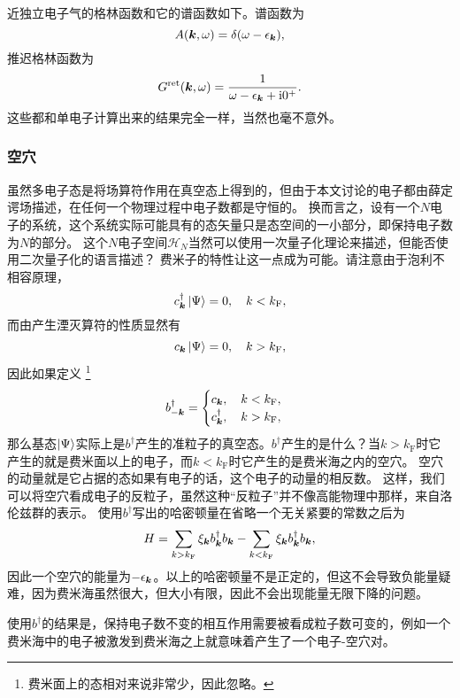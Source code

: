 \documentclass[hyperref, UTF8, a4paper]{ctexart}
\newcommand*{\ii}{\mathrm{i}}
\begin{document}
近独立电子气的格林函数和它的谱函数如下。谱函数为
\begin{equation}
    A(\vb*{k}, \omega) = \delta(\omega - \epsilon_{\vb*{k}}),
\end{equation}
推迟格林函数为
\begin{equation}
    G^\text{ret}(\vb*{k}, \omega) = \frac{1}{\omega - \epsilon_{\vb*{k}} + \ii 0^+}.
\end{equation}
这些都和单电子计算出来的结果完全一样，当然也毫不意外。

\subsubsection{空穴}

虽然多电子态是将场算符作用在真空态上得到的，但由于本文讨论的电子都由薛定谔场描述，在任何一个物理过程中电子数都是守恒的。
换而言之，设有一个$N$电子的系统，这个系统实际可能具有的态矢量只是态空间的一小部分，即保持电子数为$N$的部分。
这个$N$电子空间$\mathcal{H}_N$当然可以使用一次量子化理论来描述，但能否使用二次量子化的语言描述？
费米子的特性让这一点成为可能。请注意由于泡利不相容原理，
\[
    {c}^\dagger_{\vb*{k}} \ket{\Psi} = 0, \quad k < k_\text{F},
\]
而由产生湮灭算符的性质显然有
\[
    {c}_{\vb*{k}} \ket{\Psi} = 0, \quad k > k_\text{F},
\]
因此如果定义%
\footnote{费米面上的态相对来说非常少，因此忽略。}%
\begin{equation}
    {b}^\dagger_{-\vb*{k}} = \begin{cases}
        {c}_{\vb*{k}}, \quad k < k_\text{F}, \\
        {c}_{\vb*{k}}^\dagger, \quad k > k_\text{F},
    \end{cases}
\end{equation}
那么基态$\ket{\Psi}$实际上是${b}^\dagger$产生的准粒子的真空态。${b}^\dagger$产生的是什么？当$k>k_\text{F}$时它产生的就是费米面以上的电子，而$k<k_\text{F}$时它产生的是费米海之内的空穴。
空穴的动量就是它占据的态如果有电子的话，这个电子的动量的相反数。
这样，我们可以将空穴看成电子的反粒子，虽然这种“反粒子”并不像高能物理中那样，来自洛伦兹群的表示。
使用${b}^\dagger$写出的哈密顿量在省略一个无关紧要的常数之后为
\[
    {H} = \sum_{k > k_\text{F}} \xi_{\vb*{k}} {b}^\dagger_{\vb*{k}} {b}_{\vb*{k}} - \sum_{k < k_\text{F}} \xi_{\vb*{k}} {b}^\dagger_{\vb*{k}} {b}_{\vb*{k}},
\]
因此一个空穴的能量为$-\epsilon_{\vb*{k}}$。以上的哈密顿量不是正定的，但这不会导致负能量疑难，因为费米海虽然很大，但大小有限，因此不会出现能量无限下降的问题。

使用${b}^\dagger$的结果是，保持电子数不变的相互作用需要被看成粒子数可变的，例如一个费米海中的电子被激发到费米海之上就意味着产生了一个电子-空穴对。
\end{document}
